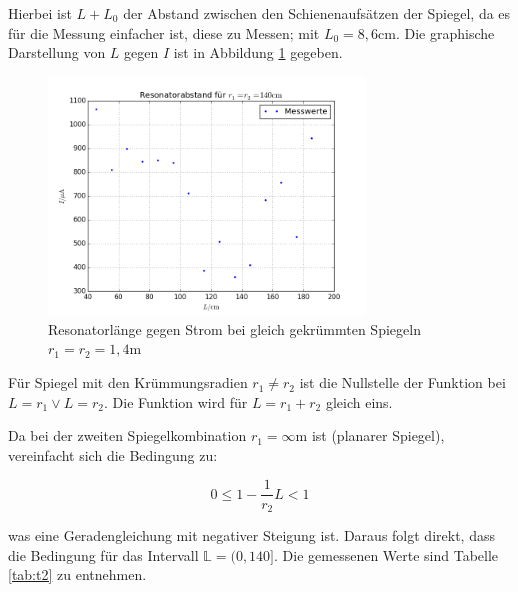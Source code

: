 \noindent Hierbei ist \(L+L_0\) der Abstand zwischen den Schienenaufsätzen der Spiegel, da es für die Messung einfacher ist, diese zu Messen; mit \(L_0=8,6\text{cm}\). Die graphische Darstellung von \(L\) gegen \(I\) ist in Abbildung \ref{fig:stabil1} gegeben.

\begin{figure}
	\centering
	\includegraphics[width=0.75\textwidth]{plots/stabil1}
	\caption{Resonatorlänge gegen Strom bei gleich gekrümmten Spiegeln \(r_1=r_2=1,4\)m}
	\label{fig:stabil1}
\end{figure}

\noindent Für Spiegel mit den Krümmungsradien \(r_1\neq r_2\) ist die Nullstelle der Funktion bei \(L=r_1\lor L=r_2\). Die Funktion wird für \(L=r_1+r_2\) gleich eins.

\noindent Da bei der zweiten Spiegelkombination \(r_1=\infty\)m ist (planarer Spiegel), vereinfacht sich die Bedingung zu:

\begin{equation}
0\le1-\frac{1}{r_2}L<1
\end{equation}

\noindent was eine Geradengleichung mit negativer Steigung ist. Daraus folgt direkt, dass die Bedingung für das Intervall \(\mathbb{L}=(0,140]\). Die gemessenen Werte sind Tabelle \ref{tab:t2} zu entnehmen.

